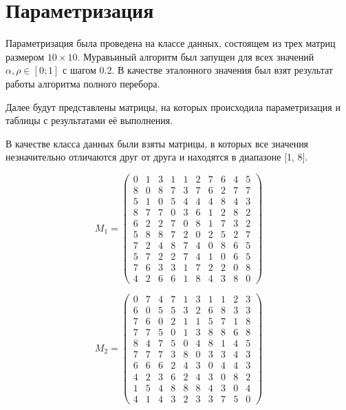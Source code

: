 \section{Параметризация}

Параметризация была проведена на классе данных, состоящем из трех матриц размером $10\times10$. Муравьиный алгоритм был запущен для всех значений $\alpha, \rho \in [0; 1]$ с шагом 0.2.
В качестве эталонного значения был взят результат работы алгоритма
полного перебора.

Далее будут представлены матрицы, на которых происходила параметризация и таблицы с результатами её выполнения.

В качестве класса данных были взяты матрицы, в которых все значения незначительно отличаются друг от друга и находятся в
диапазоне [1, 8].

\begin{equation}
	\label{eq:kd1}
	M_{1} = \begin{pmatrix}
		0 & 1 & 3 & 1 & 1 & 2 & 7 & 6 & 4 & 5 \\ 
		8 & 0 & 8 & 7 & 3 & 7 & 6 & 2 & 7 & 7 \\
		5 & 1 & 0 & 5 & 4 & 4 & 4 & 8 & 4 & 3 \\
		8 & 7 & 7 & 0 & 3 & 6 & 1 & 2 & 8 & 2 \\
		6 & 2 & 2 & 7 & 0 & 8 & 1 & 7 & 3 & 2 \\
		5 & 8 & 8 & 7 & 2 & 0 & 2 & 5 & 2 & 7 \\
		7 & 2 & 4 & 8 & 7 & 4 & 0 & 8 & 6 & 5 \\
		5 & 7 & 2 & 2 & 7 & 4 & 1 & 0 & 6 & 5 \\
		7 & 6 & 3 & 3 & 1 & 7 & 2 & 2 & 0 & 8 \\
		4 & 2 & 6 & 6 & 1 & 8 & 4 & 3 & 8 & 0 
	\end{pmatrix}
\end{equation}

\begin{equation}
	\label{eq:kd1}
	M_{2} = \begin{pmatrix}
		0 & 7& 4& 7& 1& 3& 1& 1& 2& 3 \\
		6& 0& 5& 5& 3& 2& 6& 8& 3& 3 \\
		7& 6& 0& 2& 1& 1& 5& 7& 1& 8 \\
		7& 7& 5& 0& 1& 3& 8& 8& 6& 8 \\
		8& 4& 7& 5& 0& 4& 8& 1& 4& 5 \\
		7& 7& 7& 3& 8& 0& 3& 3& 4& 3 \\
		6& 6& 6& 2& 4& 3& 0& 4& 4& 3 \\
		4& 2& 3& 6& 2& 4& 3& 0& 8& 2 \\
		1& 5& 4& 8& 8& 8& 4& 3& 0& 4 \\
		4& 1& 4& 3& 2& 3& 3& 7& 5& 0 
	\end{pmatrix}
\end{equation}


